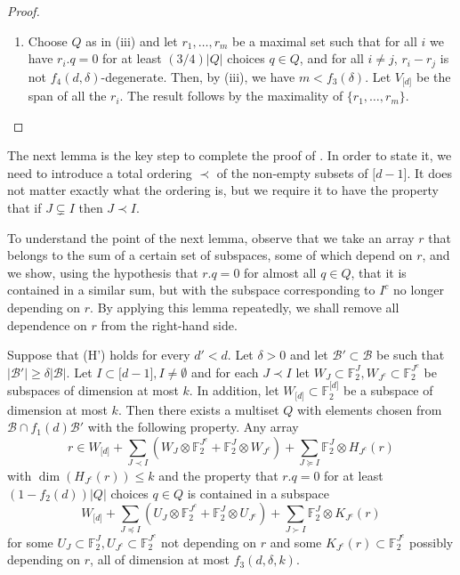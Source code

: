 \documentclass{toc}
\newcommand\F{\mathbb{F}}
\renewcommand\d{\delta}
\newcommand \cB{\mathcal B}
\newcommand \s{\subset}
\begin{document}
\begin{proof}
\begin{enumerate}[label=(\roman*)]
		\item Choose $Q$ as in (iii) and let $r_1,\dots,r_m$ be a maximal set such that for all $i$ we have $r_i.q=0$ for at least $({3}/{4})|Q|$ choices $q\in Q$, and for all $i\neq j$, $r_i-r_j$ is not $f_4(d,\d)$-degenerate. Then, by (iii), we have $m< f_3(\d)$. Let $V_{\lbrack d\rbrack}$ be the span of all the $r_i$. The result follows by the maximality of $\{r_1,\dots,r_m\}$.\qedhere
	\end{enumerate}
\end{proof}

The next lemma is the key step to complete the proof of . In order to state it, we need to introduce a total ordering $\prec$ of the non-empty subsets of $\lbrack d-1\rbrack$. It does not matter exactly what the ordering is, but we require it to have the property that if $J\subsetneq I$ then $J\prec I$.

To understand the point of the next lemma, observe that we take an array $r$ that belongs to the sum of a certain set of subspaces, some of which depend on $r$, and we show, using the hypothesis that $r.q=0$ for almost all $q\in Q$, that it is contained in a similar sum, but with the subspace corresponding to $I^c$ no longer depending on $r$. By applying this lemma repeatedly, we shall remove all dependence on $r$ from the right-hand side.

\begin{lemma} \label{keylemma}
	Suppose that (H') holds for every $d'<d$. Let $\d>0$ and let $\cB'\s \cB$ be such that $|\cB'|\geq \d|\cB|$. Let $I\s \lbrack d-1\rbrack, I\neq \emptyset$ and for each $J\prec I$ let $W_J\s \F_2^{J},W_{J^c}\s \F_2^{J^c}$ be subspaces of dimension at most $k$. In addition, let $W_{\lbrack d\rbrack}\s \F_2^{\lbrack d\rbrack}$ be a subspace of dimension at most $k$. Then there exists a multiset $Q$ with elements chosen from $\cB\cap f_1(d)\cB'$ with the following property. Any array 
	\[r\in W_{\lbrack d\rbrack}+ \sum_{J\prec I} (W_J\otimes \F_2^{J^c}+\F_2^{J}\otimes W_{J^c})+\sum_{J\succeq I} \F_2^{J}\otimes H_{J^c}(r)\] 
	with $\dim(H_{J^c}(r))\leq k$ and the property that $r.q=0$ for at least $(1-f_2(d))|Q|$ choices $q\in Q$ is contained in a subspace 
	\[W_{\lbrack d \rbrack}+\sum_{J\preceq I} (U_J\otimes \F_2^{J^c}+\F_2^{J}\otimes U_{J^c})+\sum_{J\succ I} \F_2^{J}\otimes K_{J^c}(r)\] 
	for some $U_J\s \F_2^{J},U_{J^c}\s \F_2^{J^c}$ not depending on $r$ and some $K_{J^c}(r)\s \F_2^{J^c}$ possibly depending on $r$, all of dimension at most $f_3(d,\d,k)$.
\end{lemma}
\end{document}
